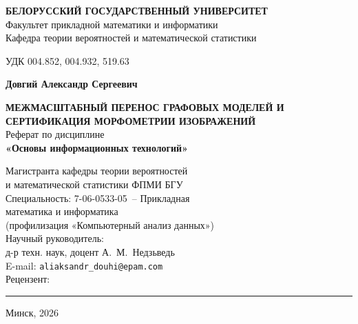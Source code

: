 
\setcounter{page}{1}
\thispagestyle{empty}

\begin{center}
    {\bfseries БЕЛОРУССКИЙ ГОСУДАРСТВЕННЫЙ УНИВЕРСИТЕТ}\\[0.35cm]
    {\small Факультет прикладной математики и информатики}\\
    {\small Кафедра теории вероятностей и математической статистики}
\end{center}

\vspace{0.8cm}

\noindent УДК 004.852, 004.932, 519.63

\vspace{1.2cm}

\begin{center}
    {\Large\bfseries Довгий Александр Сергеевич}
\end{center}

\vspace{0.7cm}

\begin{center}
    {\large\bfseries МЕЖМАСШТАБНЫЙ ПЕРЕНОС ГРАФОВЫХ МОДЕЛЕЙ И СЕРТИФИКАЦИЯ МОРФОМЕТРИИ ИЗОБРАЖЕНИЙ}\\[0.9cm]
    {\normalsize Реферат по дисциплине}\\
    {\normalsize\bfseries «Основы информационных технологий»}
\end{center}

\vspace{1.4cm}

\begin{flushright}
\begin{minipage}{0.62\textwidth}
    \small{}
    Магистранта кафедры теории вероятностей\\
    и математической статистики ФПМИ БГУ\\[0.2cm]
    Специальность: 7-06-0533-05~-- Прикладная\\
    математика и информатика\\
    (профилизация «Компьютерный анализ данных»)\\[0.2cm]
    Научный руководитель:\\
    д-р техн. наук, доцент А.~М.~Недзьведь\\[0.2cm]
    E-mail: \texttt{aliaksandr\_douhi@epam.com}\\[0.45cm]
    Рецензент:\\[0.35cm]
    \rule{\textwidth}{0.4pt}
\end{minipage}
\end{flushright}

\vfill

\begin{center}
    Минск, 2026
\end{center}

\clearpage
